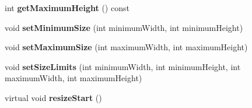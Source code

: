 \begin{DoxyCompactItemize}
\item 
int {\bfseries get\+Maximum\+Height} () const \hypertarget{class_resizable_child_afedf9f9fbe96c0bc1a0713b65b1cf55e}{}\label{class_resizable_child_afedf9f9fbe96c0bc1a0713b65b1cf55e}

\item 
void {\bfseries set\+Minimum\+Size} (int minimum\+Width, int minimum\+Height)\hypertarget{class_resizable_child_a9859e8527b8f19602eedbd57834460f8}{}\label{class_resizable_child_a9859e8527b8f19602eedbd57834460f8}

\item 
void {\bfseries set\+Maximum\+Size} (int maximum\+Width, int maximum\+Height)\hypertarget{class_resizable_child_ab2e6df2570a948fba95123abe5864a27}{}\label{class_resizable_child_ab2e6df2570a948fba95123abe5864a27}

\item 
void {\bfseries set\+Size\+Limits} (int minimum\+Width, int minimum\+Height, int maximum\+Width, int maximum\+Height)\hypertarget{class_resizable_child_a398c4578e8a3a95aab126e565ddaba83}{}\label{class_resizable_child_a398c4578e8a3a95aab126e565ddaba83}

\item 
virtual void {\bfseries resize\+Start} ()\hypertarget{class_resizable_child_aab700a53db0ffaf68f75bf29fd824b20}{}\label{class_resizable_child_aab700a53db0ffaf68f75bf29fd824b20}

\end{DoxyCompactItemize}



